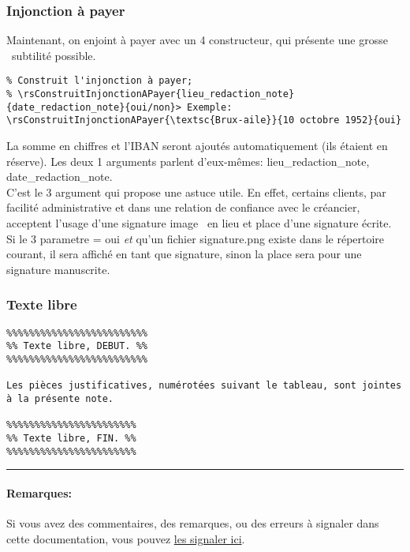 \documentclass[a4paper,10pt]{article}
\begin{document}
\subsubsection{Injonction à payer}
Maintenant, on enjoint à payer avec un 4 constructeur, qui présente une \og grosse \fg\  subtilité possible.

\begin{lstlisting}
% Construit l'injonction à payer; 
% \rsConstruitInjonctionAPayer{lieu_redaction_note}{date_redaction_note}{oui/non}> Exemple:
\rsConstruitInjonctionAPayer{\textsc{Brux-aile}}{10 octobre 1952}{oui}
\end{lstlisting}
La somme en chiffres et l'IBAN seront ajoutés automatiquement (ils étaient en réserve).
Les deux 1 arguments parlent d'eux-mêmes: lieu\_redaction\_note, date\_redaction\_note.\\

C'est le 3 argument qui propose une astuce utile.
En effet, certains clients, par facilité administrative et dans une relation de confiance avec le créancier, acceptent l'usage d'une signature \og image \fg\ en lieu et place d'une
signature écrite. Si le 3 parametre = oui \emph{et} qu'un fichier signature.png existe dans le répertoire courant, il sera affiché en tant que signature, sinon la place sera pour une signature manuscrite.

\subsubsection{Texte libre}

\begin{lstlisting}
%%%%%%%%%%%%%%%%%%%%%%%%%
%% Texte libre, DEBUT. %%
%%%%%%%%%%%%%%%%%%%%%%%%%

Les pièces justificatives, numérotées suivant le tableau, sont jointes à la présente note.

%%%%%%%%%%%%%%%%%%%%%%%
%% Texte libre, FIN. %%
%%%%%%%%%%%%%%%%%%%%%%%
\end{lstlisting}

\hrule

\paragraph*{Remarques:} Si vous avez des commentaires, des remarques,
 ou des erreurs à signaler dans cette documentation, vous pouvez \href{https://gitlab.adullact.net/zenjo/facture-belge-simple-sans-tva/issues}{les signaler ici}. 
\end{document}
